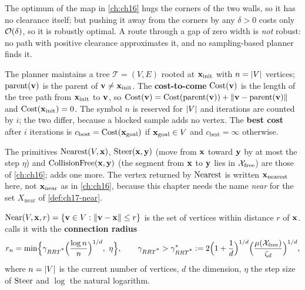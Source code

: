 The optimum of the map in \cref{ch:ch16} hugs the corners of the two walls,
so it has no clearance itself; but pushing it away from the corners by any
$\delta>0$ costs only $\mathcal{O}\!\left(\delta\right)$, so it is robustly optimal. A route
through a gap of zero width is \emph{not} robust: no path with positive
clearance approximates it, and no sampling-based planner finds it.

\begin{definition}
\label{def:ch17-tree}
The planner maintains a tree $\mathcal{T}=(V,E)$ rooted at $\mathbf{x}_{\mathrm{init}}$ with
$n=\left\lvert V \right\rvert$ vertices; $\mathrm{parent}(\mathbf{v})$ is the parent of $\mathbf{v}\ne
\mathbf{x}_{\mathrm{init}}$. The \textbf{cost-to-come}
$\mathrm{Cost}(\mathbf{v})$ is the length of the tree path from $\mathbf{x}_{\mathrm{init}}$ to
$\mathbf{v}$, so $\mathrm{Cost}(\mathbf{v})=\mathrm{Cost}(\mathrm{parent}(\mathbf{v}))+\left\lVert \mathbf{v}-\mathrm{parent}(\mathbf{v}) \right\rVert$
and $\mathrm{Cost}(\mathbf{x}_{\mathrm{init}})=0$. The symbol $n$ is reserved for
$\left\lvert V \right\rvert$ and iterations are counted by $i$; the two differ, because a
blocked sample adds no vertex. The \textbf{best cost} after $i$
iterations is $c_{\mathrm{best}}=\mathrm{Cost}(\mathbf{x}_{\mathrm{goal}})$ if
$\mathbf{x}_{\mathrm{goal}}\in V$ and $c_{\mathrm{best}}=\infty$ otherwise.
\end{definition}

The primitives $\operatorname{Nearest}(V,\mathbf{x})$, $\operatorname{Steer}(\mathbf{x},\mathbf{y})$ (move from $\mathbf{x}$ toward
$\mathbf{y}$ by at most the step $\eta$) and $\operatorname{CollisionFree}(\mathbf{x},\mathbf{y})$ (the segment
from $\mathbf{x}$ to $\mathbf{y}$ lies in $\mathcal{X}_{\mathrm{free}}$) are those of \cref{ch:ch16}; \rrtstar adds one
more. The vertex returned by $\operatorname{Nearest}$ is written $\mathbf{x}_{\mathrm{nearest}}$ here,
not $\mathbf{x}_{\mathrm{near}}$ as in \cref{ch:ch16}, because this chapter needs the
name \emph{near} for the set $X_{\mathrm{near}}$ of \cref{def:ch17-near}.

\begin{definition}
\label{def:ch17-near}
$\operatorname{Near}(V,\mathbf{x},r)=\left\{ \mathbf{v}\in V:\left\lVert \mathbf{v}-\mathbf{x} \right\rVert\le r \right\}$ is the set
of vertices within distance $r$ of $\mathbf{x}$. \rrtstar calls it with the
\textbf{connection radius}
\begin{equation}
  r_n=\min\Bigl\{\gamma_{RRT\textsuperscript{*}}\Bigl(\frac{\log n}{n}\Bigr)^{1/d},\ \eta\Bigr\},
  \qquad
  \gamma_{RRT\textsuperscript{*}}>\gamma^*_{RRT\textsuperscript{*}}:=2\Bigl(1+\frac1d\Bigr)^{1/d}\Bigl(\frac{\mu(\mathcal{X}_{\mathrm{free}})}{\zeta_d}\Bigr)^{1/d},
  \label{eq:ch17-radius}
\end{equation}
where $n=\left\lvert V \right\rvert$ is the current number of vertices, $d$ the dimension,
$\eta$ the step size of $\operatorname{Steer}$ and $\log$ the natural logarithm.
\end{definition}

